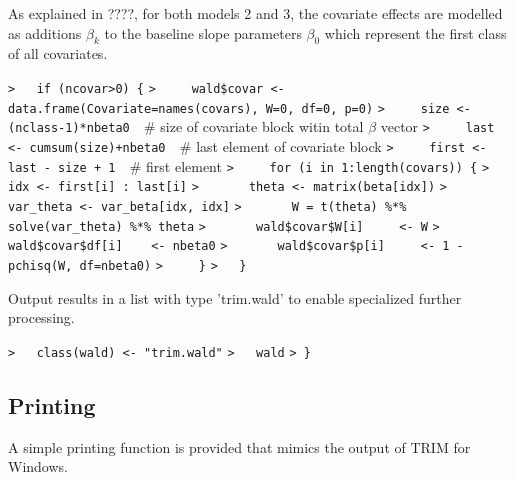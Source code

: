 \documentclass[a4paper]{article}
\begin{document}
As explained in ????, for both models 2 and 3, the covariate effects are modelled as additions $\beta_k$ to the
baseline slope parameters $\beta_0$ which represent the first class of all covariates.\par
\verb~>   if (ncovar>0) {~\newline
\verb~>     wald$covar <- data.frame(Covariate=names(covars), W=0, df=0, p=0)~\newline
\verb~>     size <- (nclass-1)*nbeta0  ~{\sffamily\# size of covariate block witin total $\beta$ vector}\newline
\verb~>     last <- cumsum(size)+nbeta0  ~{\sffamily\# last element of covariate block}\newline
\verb~>     first <- last - size + 1  ~{\sffamily\# first element}\newline
\verb~>     for (i in 1:length(covars)) {~\newline
\verb~>       idx <- first[i] : last[i]~\newline
\verb~>       theta <- matrix(beta[idx])~\newline
\verb~>       var_theta <- var_beta[idx, idx]~\newline
\verb~>       W = t(theta) %*% solve(var_theta) %*% theta~\newline
\verb~>       wald$covar$W[i]     <- W~\newline
\verb~>       wald$covar$df[i]    <- nbeta0~\newline
\verb~>       wald$covar$p[i]     <- 1 - pchisq(W, df=nbeta0)~\newline
\verb~>     }~\newline
\verb~>   }~\par

Output results in a list with type 'trim.wald' to enable specialized further processing.\par
\verb~>   class(wald) <- "trim.wald"~\newline
\verb~>   wald~\newline
\verb~> }~\par




\subsection{Printing}\par

A simple printing function is provided that mimics the output of TRIM for Windows.\par
\end{document}
